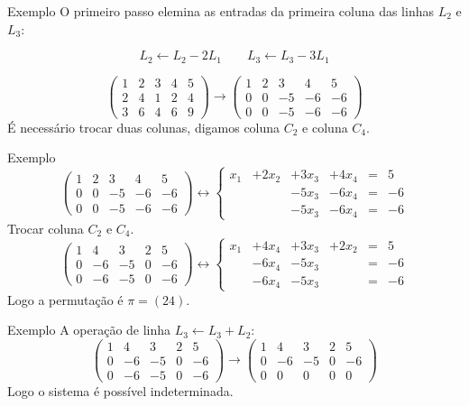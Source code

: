 \documentclass{beamer}
\begin{document}
\begin{frame}{Exemplo}
O primeiro passo elemina as entradas da primeira coluna das linhas $L_2$ e $L_3$:

$$ L_2 \leftarrow L_2 - 2L_1 \qquad L_3 \leftarrow L_3 - 3L_1$$

$$\left( \begin{array}{rrrr|r}
1 & 2& 3& 4& 5 \\
2&  4& 1& 2& 4 \\
3& 6& 4& 6& 9 
\end{array}\right)
\rightarrow 
\left( \begin{array}{rrrr|r}
1 & 2& 3& 4& 5 \\
0&  0& -5& -6& -6 \\
0& 0& -5& -6& -6 
\end{array}\right)$$
É necessário trocar duas colunas, digamos coluna $C_2$ e coluna $C_4$.
\end{frame}


\begin{frame}{Exemplo}
$$\left( \begin{array}{rrrr|r}
1 & 2& 3& 4& 5 \\
0&  0& -5& -6& -6 \\
0& 0& -5& -6& -6 
\end{array}\right)
\leftrightarrow 
\left\{ \begin{array}{rrrrcr}
x_1 & +2x_2  &+3x_3 &+4x_4 &=&5 \\
    &        &-5x_3 &-6x_4 &=&-6 \\
    &        &-5x_3 &-6x_4 &=&-6 
\end{array}\right.$$
Trocar coluna $C_2$ e $C_4$.
$$\left( \begin{array}{rrrr|r}
1 & 4& 3& 2& 5 \\
0&  -6& -5& 0& -6 \\
0& -6& -5& 0& -6 
\end{array}\right)
\leftrightarrow 
\left\{ \begin{array}{rrrrcr}
x_1 &   +4x_4 &+3x_3 &+2x_2 &=&5 \\
    &   -6x_4      &-5x_3 & &=&-6 \\
    &    -6x_4     &-5x_3 &&=&-6 
\end{array}\right.$$
Logo a permutação é $\pi=(24)$.
\end{frame}


\begin{frame}{Exemplo}
A operação de linha $L_3 \leftarrow L_3+L_2$:
$$\left( \begin{array}{rrrr|r}
1 & 4& 3& 2& 5 \\
0&  -6& -5& 0& -6 \\
0& -6& -5& 0& -6 
\end{array}\right)
\rightarrow 
\left( \begin{array}{rrrr|r}
1 & 4& 3& 2& 5 \\
0&  -6& -5& 0& -6 \\
0& 0& 0& 0& 0 
\end{array}\right)$$
Logo o sistema é possível indeterminada.
\end{frame}
\end{document}
